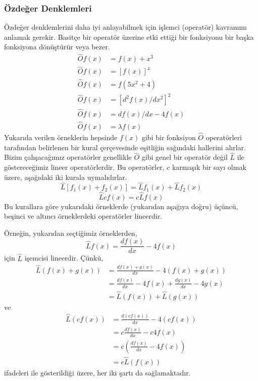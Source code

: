 \documentclass[a4paper,12pt, twoside]{article}
\begin{document}
\subsubsection{Özdeğer Denklemleri}

Özdeğer denklemlerini daha iyi anlayabilmek için işlemci (operatör) kavramını anlamak gerekir. Basitçe bir operatör üzerine etki ettiği bir fonksiyonu bir başka fonksiyona dönüştürür veya bezer. 
\begin{align*} 
	\hat O f ( x ) &= f ( x ) + x ^ { 3 }  \\ 
	\hat O f ( x ) &= [ f ( x ) ] ^ { 4 }  \\ 
	\hat O f ( x ) &= f ( 5 x^2 + 4 )  \\ 
	\hat O f ( x ) &= [ d^2 f ( x ) / d x^2 ] ^ { 2 }  \\ 
	\hat O f ( x ) &= d f ( x ) / d x - 4 f ( x )  \\ 
	\hat O f ( x ) &= \lambda f ( x )  
\end{align*}
Yukarıda verilen örneklerin hepsinde $f(x)$ gibi bir fonksiyon $\hat O$ operatörleri tarafından belirlenen bir kural çerçevesinde eşitliğin sağındaki hallerini alırlar. Bizim çalışacağımız operatörler genellikle $\hat O$ gibi genel bir operatör değil $\hat L$ ile göstereceğimiz lineer operatörlerdir. Bu operatörler, $c$ karmaşık bir sayı olmak üzere, aşağıdaki iki kurala uymalıdırlar.
\begin{equation}
\hat L \left[ f _ { 1 } ( x ) + f _ { 2 } ( x ) \right] = \hat  L f _ { 1 } ( x ) + \hat  L f _ { 2 } ( x )
\end{equation}
\begin{equation}
\hat L c f ( x ) = c \hat L f ( x )
\end{equation}
Bu kurallara göre yukarıdaki örneklerde (yukarıdan aşağıya doğru) üçüncü, beşinci ve altıncı örneklerdeki operatörler lineerdir. 

Örneğin, yukarıdan seçtiğimiz örneklerden,
\begin{equation*}
\hat  L f ( x ) = \frac { d f ( x ) } { d x } - 4 f ( x )
\end{equation*}
için $\hat L$ işemcisi lineerdir. Çünkü,
\begin{align*}
\hat  L (f ( x ) + g(x)) &= \frac { d f ( x ) + g(x)} { d x } - 4 (f ( x ) + g ( x ))\\
&= \frac { d f ( x ) } { d x } - 4 f ( x ) + \frac { d g ( x ) } { d x } - 4 g ( x ) \\
&= \hat  L (f ( x )) + \hat  L (g ( x ))
\end{align*}
ve
\begin{align*}
\hat  L (c f ( x )) &= \frac { d (c f ( x ))} { d x } - 4 (c f ( x ))\\
&= c\frac { d f ( x ) } { d x } - c 4 f ( x ) \\
&= c(\frac { d f ( x ) } { d x } -  4 f ( x )) \\
&=  c \hat L (f ( x ))
\end{align*}
ifadeleri ile gösterildiği üzere, her iki şartı da sağlamaktadır.
\end{document}

